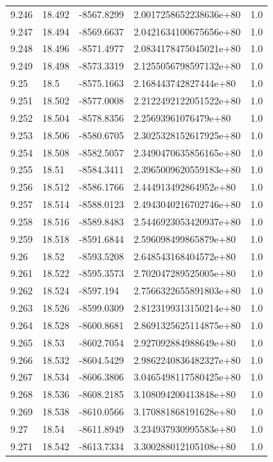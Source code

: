 \begin{tabular}{lllll}
9.246 & 18.492 & -8567.8299 & 2.0017258652238636e+80 & 1.0 \\
9.247 & 18.494 & -8569.6637 & 2.0421634100675656e+80 & 1.0 \\
9.248 & 18.496 & -8571.4977 & 2.0834178475045021e+80 & 1.0 \\
9.249 & 18.498 & -8573.3319 & 2.1255056798597132e+80 & 1.0 \\
9.25 & 18.5 & -8575.1663 & 2.168443742827444e+80 & 1.0 \\
9.251 & 18.502 & -8577.0008 & 2.2122492122051522e+80 & 1.0 \\
9.252 & 18.504 & -8578.8356 & 2.25693961076479e+80 & 1.0 \\
9.253 & 18.506 & -8580.6705 & 2.3025328152617925e+80 & 1.0 \\
9.254 & 18.508 & -8582.5057 & 2.3490470635856165e+80 & 1.0 \\
9.255 & 18.51 & -8584.3411 & 2.3965009620559183e+80 & 1.0 \\
9.256 & 18.512 & -8586.1766 & 2.444913492864952e+80 & 1.0 \\
9.257 & 18.514 & -8588.0123 & 2.4943040216702746e+80 & 1.0 \\
9.258 & 18.516 & -8589.8483 & 2.5446923053420937e+80 & 1.0 \\
9.259 & 18.518 & -8591.6844 & 2.596098499865879e+80 & 1.0 \\
9.26 & 18.52 & -8593.5208 & 2.648543168404572e+80 & 1.0 \\
9.261 & 18.522 & -8595.3573 & 2.702047289525005e+80 & 1.0 \\
9.262 & 18.524 & -8597.194 & 2.7566322655891803e+80 & 1.0 \\
9.263 & 18.526 & -8599.0309 & 2.8123199313150214e+80 & 1.0 \\
9.264 & 18.528 & -8600.8681 & 2.8691325625114875e+80 & 1.0 \\
9.265 & 18.53 & -8602.7054 & 2.927092884988649e+80 & 1.0 \\
9.266 & 18.532 & -8604.5429 & 2.9862240836482327e+80 & 1.0 \\
9.267 & 18.534 & -8606.3806 & 3.0465498117580425e+80 & 1.0 \\
9.268 & 18.536 & -8608.2185 & 3.108094200413848e+80 & 1.0 \\
9.269 & 18.538 & -8610.0566 & 3.170881868191628e+80 & 1.0 \\
9.27 & 18.54 & -8611.8949 & 3.234937930995583e+80 & 1.0 \\
9.271 & 18.542 & -8613.7334 & 3.300288012105108e+80 & 1.0 \\

\end{tabular}
